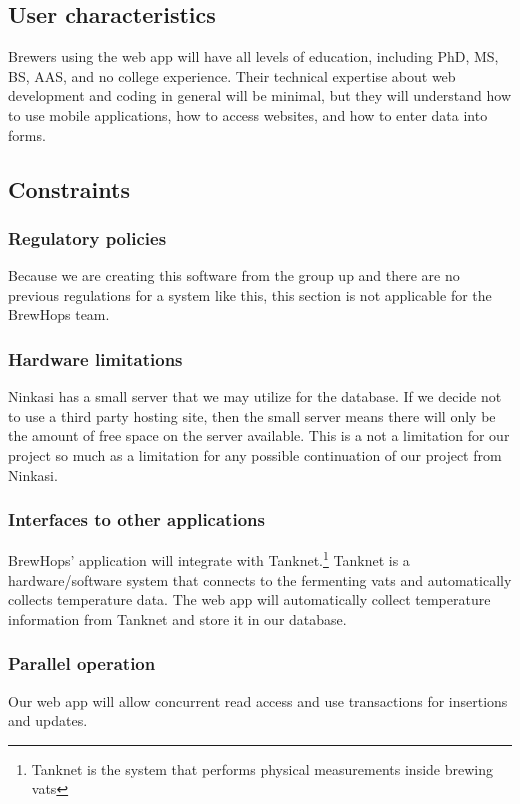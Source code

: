\documentclass[draftclsnofoot,onecolumn,letterpaper,10pt,compsoc]{IEEEtran}
\begin{document}
	\subsection{User characteristics}
		Brewers using the web app will have all levels of education, including PhD, MS, BS, AAS, and no college experience.
		Their technical expertise about web development and coding in general will be minimal, but they will understand how to use mobile applications, how to access websites, and how to enter data into forms.

	\subsection{Constraints}
		\subsubsection{Regulatory policies}
		Because we are creating this software from the group up and there are no previous regulations for a system like this, this section is not applicable for the BrewHops team.

		\subsubsection{Hardware limitations}
		Ninkasi has a small server that we may utilize for the database.
		If we decide not to use a third party hosting site, then the small server means there will only be the amount of free space on the server available.
		This is a not a limitation for our project so much as a limitation for any possible continuation of our project from Ninkasi.

		\subsubsection{Interfaces to other applications}
		BrewHops’ application will integrate with Tanknet.\footnote{Tanknet is the system that performs physical measurements inside brewing vats}
		Tanknet is a hardware/software system that connects to the fermenting vats and automatically collects temperature data.
		The web app will automatically collect temperature information from Tanknet and store it in our database.


		\subsubsection{Parallel operation}
        Our web app will allow concurrent read access and use transactions for insertions and updates.
\end{document}
